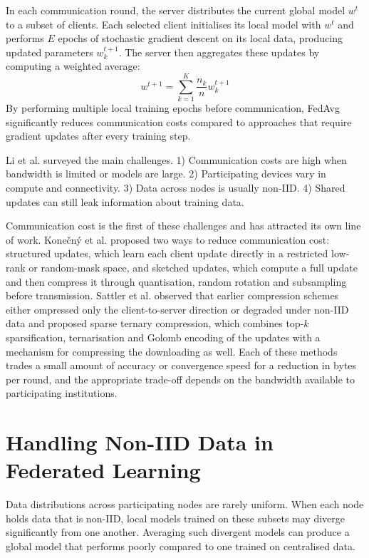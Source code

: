 \documentclass[12pt,openany,a4paper]{book}
\begin{document}
In each communication round, the server distributes the current global model $w^t$ to a subset of clients. Each selected client initialises its local model with $w^t$ and performs $E$ epochs of stochastic gradient descent on its local data, producing updated parameters $w_k^{t+1}$. The server then aggregates these updates by computing a weighted average:
\begin{equation}
w^{t+1} = \sum_{k=1}^{K} \frac{n_k}{n} w_k^{t+1}
\end{equation}
By performing multiple local training epochs before communication, FedAvg significantly reduces communication costs compared to approaches that require gradient updates after every training step.

Li et al. \cite{liFederatedLearningChallenges2020} surveyed the main challenges. 1) Communication costs are high when bandwidth is limited or models are large. 2) Participating devices vary in compute and connectivity. 3) Data across nodes is usually non-IID. 4) Shared updates can still leak information about training data.

Communication cost is the first of these challenges and has attracted its own line of work. Kone\v{c}n\'y et al. \cite{konecVnyFEDERATEDLEARNINGSTRATEGIES} proposed two ways to reduce communication cost: structured updates, which learn each client update directly in a restricted low-rank or random-mask space, and sketched updates, which compute a full update and then compress it through quantisation, random rotation and subsampling before transmission. Sattler et al. \cite{sattlerRobustCommunicationEfficientFederated2019} observed that earlier compression schemes either ompressed only the client-to-server direction or degraded under non-IID data and proposed sparse ternary compression, which combines top-$k$ sparsification, ternarisation and Golomb encoding of the updates with a mechanism for compressing the downloading as well. Each of these methods trades a small amount of accuracy or convergence speed for a reduction in bytes per round, and the appropriate trade-off depends on the bandwidth available to participating institutions.
\section{Handling Non-IID Data in Federated Learning}

Data distributions across participating nodes are rarely uniform. When each node holds data that is non-IID, local models trained on these subsets may diverge significantly from one another. Averaging such divergent models can produce a global model that performs poorly compared to one trained on centralised data.
 
\end{document}
